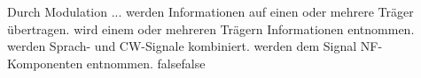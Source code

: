     {Durch Modulation ...}
    {werden Informationen auf einen oder mehrere Träger übertragen.}
    {wird einem oder mehreren Trägern Informationen entnommen.}
    {werden Sprach- und CW-Signale kombiniert.}
    {werden dem Signal NF-Komponenten entnommen.}
    {false}{false}